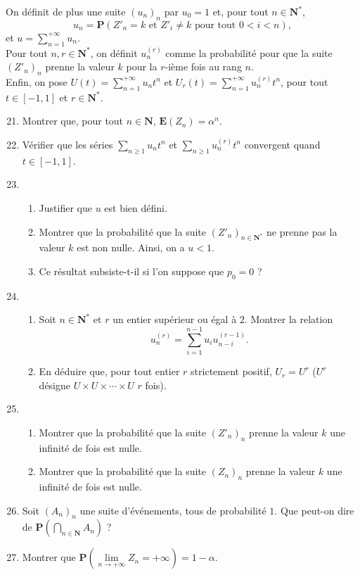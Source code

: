 \documentclass[a4paper,11pt]{article}
\newcommand{\N}{\mathbf{N}}
\renewcommand{\P}{\mathbf{P}}
\newcommand{\E}{\mathbf{E}}
\newcommand{\suite}[2]{{\left({#1}_{#2}\right)}_{#2}}
\begin{document}
On définit de plus une suite $\suite{u}{n}$ par $u_0=1$ et, pour tout $n\in\N^*$,
\[u_{n}=\P\left({Z'}_n=k\text{ et }{Z'_i}\neq k\text{ pour tout }0<i<n\right),\]
et $u=\displaystyle\sum_{n=1}^{+\infty}u_n$.\\

Pour tout $n,r\in\N^*$, on définit $u_n^{(r)}$ comme la probabilité pour que la suite $\suite{Z'}{n}$ prenne la valeur $k$ pour la $r$-ième fois au rang $n$. \\

Enfin, on pose $U(t)=\displaystyle\sum_{n=1}^{+\infty}u_nt^n$ et $U_r(t)=\displaystyle\sum_{n=1}^{+\infty}u_n^{(r)}t^n$, pour tout $t\in[-1,1]$ et $r\in\N^*$.

\begin{enumerate}
\setcounter{enumi}{20}
\item Montrer que, pour tout $n\in\N$, $\E(Z_n)=\alpha^n$.
\item Vérifier que les séries $\displaystyle\sum_{n\geq 1}u_nt^n$ et $\displaystyle\sum_{n\geq 1}u_n^{(r)}t^n$ convergent quand $t\in[-1,1]$.
\item 
\begin{enumerate}
\item Justifier que $u$ est bien défini.
\item Montrer que la probabilité que la suite ${\left({Z'}_n\right)}_{n\in\N^*}$ ne prenne pas la valeur $k$ est non nulle. Ainsi, on a $u<1$.
\item Ce résultat subsiste-t-il si l'on suppose que $p_0=0$ ?
\end{enumerate}
\item \begin{enumerate}
\item Soit $n\in\N^*$ et $r$ un entier supérieur ou égal à $2$. Montrer la relation
\[u_n^{(r)}=\displaystyle\sum_{i=1}^{n-1}u_iu_{n-i}^{(r-1)}.\]
\item En déduire que, pour tout entier $r$ strictement positif, $U_r=U^r$ ($U^r$ désigne $U\times U\times\cdots\times U$ $r$ fois).
\end{enumerate}
\item
\begin{enumerate}
\item Montrer que la probabilité que la suite $\suite{Z'}{n}$ prenne la valeur $k$ une infinité de fois est nulle.
\item Montrer que la probabilité que la suite $\suite{Z}{n}$ prenne la valeur $k$ une infinité de fois est nulle.
\end{enumerate}
\item Soit $\suite{A}{n}$ une suite d'événements, tous de probabilité $1$. Que peut-on dire de $\P\left(\displaystyle\bigcap _{n\in\N}A_n\right)$ ?
\item Montrer que $\P\left(\lim\limits_{n\to+\infty}Z_n=+\infty\right)=1-\alpha$.
\end{enumerate}
\end{document}
